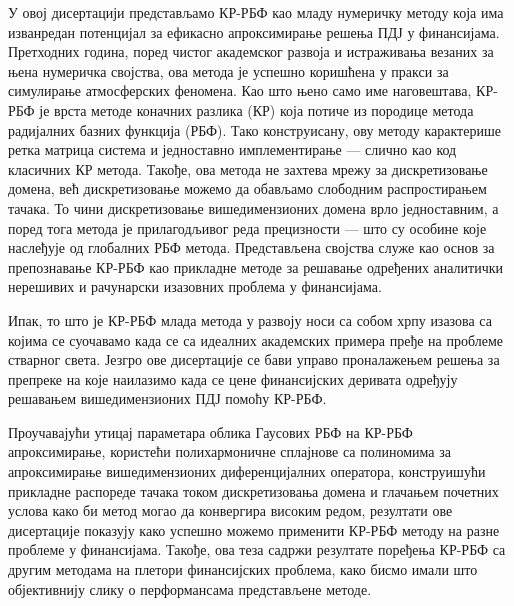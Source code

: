 \documentclass{UUThesisTemplate}
\begin{document}
\begin{serbian}
{\par
У овој дисертацији представљамо КР-РБФ као младу нумеричку методу која има изванредан потенцијал за ефикасно апроксимирање решења ПДЈ у финансијама. Претходних година, поред чистог академског развоја и истраживања везаних за њена нумеричка својства, ова метода је успешно коришћена у пракси за симулирање атмосферских феномена. Као што њено само име наговештава, КР-РБФ је врста методе коначних разлика (КР) која потиче из породице метода радијалних базних функција (РБФ). %
Тако конструисану, ову методу карактерише ретка матрица система и једноставно имплементирање --- слично као код класичних КР метода. Такође, ова метода не захтева мрежу за дискретизовање домена, већ дискретизовање можемо да обављамо слободним распростирањем тачака. То чини дискретизовање вишедимензионих домена врло једноставним, а поред тога метода је прилагодљивог реда прецизности --- што су особине које наслеђује од глобалних РБФ метода. Представљена својства служе као основ за препознавање КР-РБФ као прикладне методе за решавање одређених аналитички нерешивих и рачунарски изазовних проблема у финансијама.
\par
Ипак, то што је КР-РБФ млада метода у развоју носи са собом хрпу изазова са којима се суочавамо када се са идеалних академских примера пређе на проблеме стварног света. Језгро ове дисертације се бави управо проналажењем решења за препреке на које наилазимо када се цене финансијских деривата одређују решавањем вишедимензионих ПДЈ помоћу КР-РБФ. 

\par 
Проучавајући утицај параметара облика Гаусових РБФ на КР-РБФ апроксимирање, користећи полихармоничне сплајнове са полиномима за апроксимирање вишедимензионих диференцијалних оператора, конструишући прикладне распореде тачака током дискретизовања домена и глачањем почетних услова како би метод могао да конвергира високим редом, резултати ове дисертације показују како успешно можемо применити КР-РБФ методу на разне проблеме у финансијама. Такође, ова теза садржи резултате поређења КР-РБФ са другим методама на плетори финансијских проблема, како бисмо имали што објективнију слику о перформансама представљене методе.

}
\end{serbian}
\end{document}
